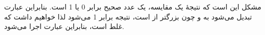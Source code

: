 \section{}
\paragraph{}\label{answer:80}
 مشکل این است که نتیجهٔ یک مقایسه، یک عدد صحیح برابر 0 یا 1 است. بنابراین عبارت  تبدیل می‌شود به  و چون  بزرگتر از  است، نتیجه  برابر 1 می‌شود لذا خواهیم داشت  که غلط است، بنابراین عبارت  اجرا می‌شود.